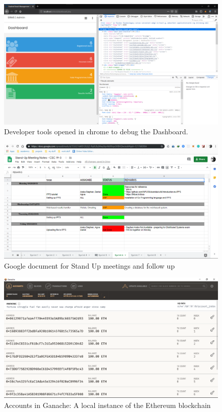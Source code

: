 \begin{figure}[H]
\center
\includegraphics[scale=0.3]{images/dev_tools.png}
\caption{Developer tools opened in chrome to debug the Dashboard.}
\end{figure}

\begin{figure}[H]
\center
\includegraphics[scale=0.3]{images/docs.png}
\caption{Google document for Stand Up meetings and follow up}
\end{figure}

\begin{figure}[H]
\center
\includegraphics[scale=0.3]{images/ganache.png}
\caption{Accounts in Ganache: A local instance of the Ethereum blockchain}
\end{figure}

